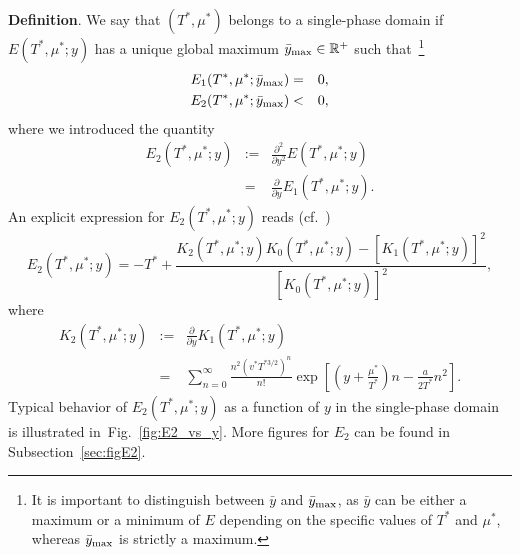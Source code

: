 \documentclass[12pt]{article}
\numberwithin{equation}{section}
\begin{document}
	\textbf{Definition}. We say that $(T^*, \mu^*)$ belongs to a single-phase domain if $E(T^*,\mu^*;y)$ has a unique global maximum $\bar{y}_{\rm max} \in \mathbb{R}^{+}$ such that~\footnote{It is important to distinguish between $\bar{y}$ and $\bar{y}_{\rm max}$, as $\bar{y}$ can be either a maximum or a minimum of $E$ depending on the specific values of $T^*$ and $\mu^*$, whereas $\bar{y}_{\rm max}$ is strictly a maximum.}
	\begin{eqnarray}
		\label{cond:max}
		E_1(T^*, \mu^*; \bar{y}_{\rm max}) & = & 0,
		\nonumber\\
		E_2(T^*, \mu^*;\bar{y}_{\rm max}) & < & 0,
	\end{eqnarray}
	where we introduced the quantity
	\begin{eqnarray}
		\label{def:E2}
		E_2(T^*, \mu^*;y) & := & \frac{\partial^2}{\partial y^2} E(T^*,\mu^*;y)
		\\
		& = & \frac{\partial}{\partial y} E_1(T^*,\mu^*;y).
		\nonumber
	\end{eqnarray}
	An explicit expression for $E_2(T^*,\mu^*;y)$ reads (cf.~\cite[(20)]{KD22})
	\begin{equation}
		\label{def:reducedE2}
		E_2(T^*,\mu^*;y) = -T^* + \frac{K_2(T^*,\mu^*;y) K_0(T^*,\mu^*;y) - [K_1(T^*,\mu^*;y)]^2}{[K_0(T^*,\mu^*;y)]^2},
	\end{equation}
	where
	\begin{eqnarray}
		K_2(T^*,\mu^*;y) & := & \frac{\partial}{\partial y} K_1(T^*,\mu^*;y)
		\nonumber\\
		& = & \sum_{n=0}^{\infty} \frac{n^2 (v^* T^{*3/2})^n}{n!} \exp[\left(y+\frac{\mu^*}{T^*}\right)n - \frac{a}{2T^*}n^2].
	\end{eqnarray}
	Typical behavior of $E_2(T^*,\mu^*;y)$ as a function of $y$ in the single-phase domain is illustrated in~Fig.~\ref{fig:E2_vs_y}. More figures for $E_2$ can be found in Subsection~\ref{sec:figE2}.
	
\end{document}
